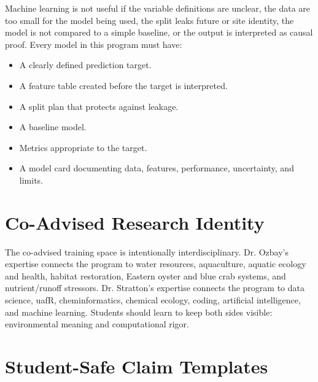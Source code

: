 Machine learning is not useful if the variable definitions are unclear, the data are too small for the model being used, the split leaks future or site identity, the model is not compared to a simple baseline, or the output is interpreted as causal proof. Every model in this program must have:
\begin{itemize}
  \item A clearly defined prediction target.
  \item A feature table created before the target is interpreted.
  \item A split plan that protects against leakage.
  \item A baseline model.
  \item Metrics appropriate to the target.
  \item A model card documenting data, features, performance, uncertainty, and limits.
\end{itemize}

\section{Co-Advised Research Identity}

The co-advised training space is intentionally interdisciplinary. Dr. Ozbay's expertise connects the program to water resources, aquaculture, aquatic ecology and health, habitat restoration, Eastern oyster and blue crab systems, and nutrient/runoff stressors. Dr. Stratton's expertise connects the program to data science, uafR, cheminformatics, chemical ecology, coding, artificial intelligence, and machine learning. Students should learn to keep both sides visible: environmental meaning and computational rigor.

\section{Student-Safe Claim Templates}

